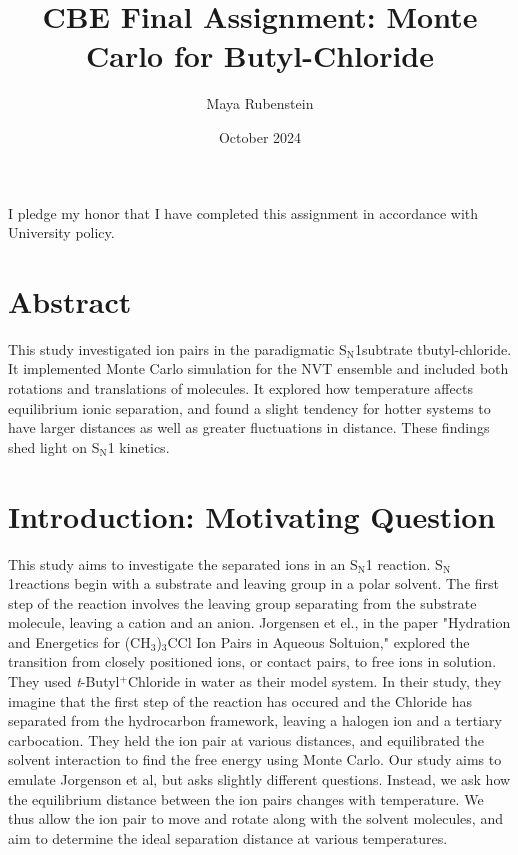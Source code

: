 \documentclass[12pt]{article}
\title{CBE Final Assignment: Monte Carlo for Butyl-Chloride}
\author{Maya Rubenstein}
\date{October 2024}
\def\sn#1{\times 10^{#1}}
\begin{document}
\maketitle

\setlength\heavyrulewidth{0.25ex}
\setlength\lightrulewidth{0.15ex}
\captionsetup{aboveskip=3pt, belowskip = 6 pt}

\noindent I pledge my honor that I have completed this assignment in accordance with University policy.

\newcommand{\tbutyl}{\textit{t}-Butyl$^{+}$}
\renewcommand{\sn}{S$_{\text{N}}$1}

\section{Abstract}
This study investigated ion pairs in the paradigmatic \sn subtrate tbutyl-chloride. It implemented Monte Carlo simulation for the NVT ensemble and included both rotations and translations of molecules. It explored how temperature affects equilibrium ionic separation, and found a slight tendency for hotter systems to have larger distances as well as greater fluctuations in distance. These findings shed light on \sn \: kinetics.

\section{Introduction: Motivating Question}
This study aims to investigate the separated ions in an \sn \:  reaction. \sn reactions begin with a substrate and leaving group in a polar solvent. The first step of the reaction involves the leaving group separating from the substrate molecule, leaving a cation and an anion. Jorgensen et el., in the paper "Hydration and Energetics for (CH$_{3}$)$_{3}$CCl Ion Pairs in Aqueous Soltuion," explored the transition from closely positioned ions, or contact pairs, to free ions in solution. They used \tbutyl Chloride in water as their model system. In their study, they imagine that the first step of the reaction has occured and the Chloride has separated from the hydrocarbon framework, leaving a halogen ion and a tertiary carbocation. They held the ion pair at various distances, and equilibrated the solvent interaction to find the free energy using Monte Carlo. Our study aims to emulate Jorgenson et al, but asks slightly different questions. Instead, we ask how the equilibrium distance between the ion pairs changes with temperature. We thus allow the ion pair to move and rotate along with the solvent molecules, and aim to determine the ideal separation distance at various temperatures.
    
\end{document}
